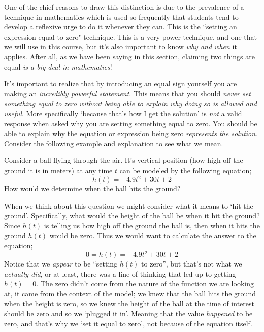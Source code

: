 \documentclass{ximera}
\begin{document}
    One of the chief reasons to draw this distinction is due to the prevalence of a technique in mathematics which is used so frequently that students tend to develop a reflexive urge to do it whenever they can. This is the ``setting an expression equal to zero" technique. This is a very power technique, and one that we will use in this course, but it's also important to know \textit{why and when} it applies. After all, as we have been saying in this section, claiming two things are equal \textit{is a big deal in mathematics}!

    It's important to realize that by introducing an equal sign yourself you are making an \textit{incredibly powerful statement}. This means that you should \textit{never set something equal to zero without being able to explain why doing so is allowed and useful}. More specifically `because that's how I get the solution' is \textit{not} a valid response when asked why you are setting something equal to zero. You should be able to explain why the equation or expression being zero \textit{represents the solution}. Consider the following example and explanation to see what we mean.
    
    \begin{explanation}%
        Consider a ball flying through the air. It's vertical position (how high off the ground it is in meters) at any time $t$ can be modeled by the following equation;
        \[
            h(t) = -4.9t^2 + 30t + 2
        \]
        How would we determine when the ball hits the ground?
    
        When we think about this question we might consider what it means to `hit the ground'. Specifically, what would the height of the ball be when it hit the ground? Since $h(t)$ is telling us how high off the ground the ball is, then when it hits the ground $h(t)$ would be zero. Thus we would want to calculate the answer to the equation;
        \[
            0 = h(t) = -4.9t^2 + 30t + 2
        \]
        Notice that we \textit{appear} to be ``setting $h(t)$ to zero'', but that's not what we \textit{actually did}, or at least, there was a line of thinking that led up to getting $h(t) = 0$. The zero didn't come from the nature of the function we are looking at, it came from the context of the model; we knew that the ball hits the ground when the height is zero, so we knew the height of the ball at the time of interest should be zero and so we `plugged it in'. Meaning that the value \textit{happened} to be zero, and that's why we `set it equal to zero', not because of the equation itself.
    \end{explanation}
    
\end{document}
